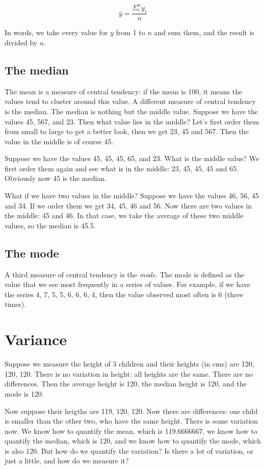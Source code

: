 \begin{equation}
\bar{y} = \frac{\Sigma_i^n y_i}{n}
\end{equation}

In words, we take every value for $y$ from 1 to $n$ and sum them, and the result is divided by $n$.

\subsection{The median}
The mean is a measure of central tendency: if the mean is 100, it means the values tend to cluster around this value. A different measure of central tendency is the median. The median is nothing but the middle value. Suppose we have the values 45, 567, and 23. Then what value lies in the middle? Let's first order them from small to large to get a better look, then we get 23, 45 and 567. Then the value in the middle is of course 45. 

Suppose we have the values 45, 45, 45, 65, and 23. What is the middle value? We first order them again and see what is in the middle: 23, 45, 45, 45 and 65. Obviously now 45 is the median. 

What if we have two values in the middle? Suppose we have the values 46, 56, 45 and 34. If we order them we get 34, 45, 46 and 56. Now there are two values in the middle: 45 and 46. In that case, we take the average of these two middle values, so the median is 45.5.

\subsection{The mode}
A third measure of central tendency is the \textit{mode}. The mode is defined as the value that we see most frequently in a series of values. For example, if we have the series 4, 7, 5, 5, 6, 6, 6, 4, then the value observed most often is 6 (three times).  




\section{Variance}

Suppose we measure the height of 3 children and their heights (in cms) are 120, 120, 120. There is no variation in height: all heights are the same. There are no differences. Then the average height is 120, the median height is 120, and the mode is 120. 

Now suppose their heigths are 119, 120, 120. Now there are differences: one child is smaller than the other two, who have the same height. There is some variation now. We know how to quantify the mean, which is 119.6666667, we know how to quantify the median, which is 120, and we know how to quantify the mode, which is also 120. But how do we quantify the variation? Is there a lot of variation, or just a little, and how do we measure it? 


